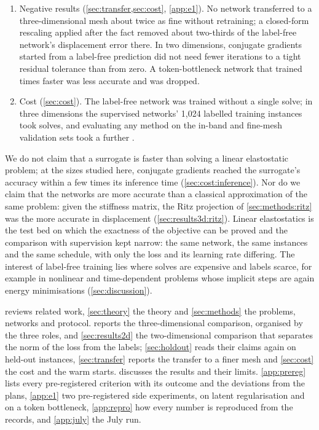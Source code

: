 \begin{enumerate}
label-free transformer on most instances at every degree, and a comparable relative energy
gap at the highest, but median peak stress errors \numRitzValPeakRatioMin{} to
\numRitzValPeakRatioMax{} times as large; on the finer mesh its relative energy gap was
lower than each network's on almost every instance.
\item Negative results (\cref{sec:transfer,sec:cost}, \ref{app:e1}). No network transferred
to a three-dimensional mesh about twice as fine without retraining; a closed-form rescaling
applied after the fact removed about two-thirds of the label-free network's displacement
error there. In two dimensions, conjugate gradients started from a label-free prediction did
not need fewer iterations to a tight residual tolerance than from zero. A token-bottleneck
network that trained \numTimeBottleneckSpeedup{} times faster was less accurate and was
dropped.
\item Cost (\cref{sec:cost}). The label-free network was trained without a single solve;
in three dimensions the supervised networks' 1,024 labelled training instances took
\numThreeTrainSolves{} solves, and evaluating any method on the in-band and fine-mesh
validation sets took a further \numThreeEvalSolves{}.
\end{enumerate}

We do not claim that a surrogate is faster than solving a linear elastostatic problem; at
the sizes studied here, conjugate gradients reached the surrogate's accuracy within a few
times its inference time (\cref{sec:cost:inference}). Nor do we claim that the networks are
more accurate than a classical approximation of the same problem: given the stiffness
matrix, the Ritz projection of \cref{sec:methods:ritz} was the more accurate in displacement
(\cref{sec:results3d:ritz}). Linear elastostatics is the test bed on which the exactness of
the objective can be proved and the comparison
with supervision kept narrow: the same network, the same instances and the same schedule,
with only the loss and its learning rate differing. The interest of label-free training lies
where solves are expensive and labels scarce, for example in nonlinear and time-dependent
problems whose implicit steps are again energy minimisations (\cref{sec:discussion}).

 reviews related work, \cref{sec:theory} the theory and
\cref{sec:methods} the problems, networks and protocol.  reports the
three-dimensional comparison, organised by the three roles, and \cref{sec:results2d} the
two-dimensional comparison that separates the norm of the loss from the labels;
\cref{sec:holdout} reads their claims again on held-out instances, \cref{sec:transfer}
reports the transfer to a finer mesh and \cref{sec:cost} the cost and the warm starts.
 discusses the results and their limits.
\ref{app:prereg} lists every pre-registered criterion with its outcome and the deviations
from the plans, \ref{app:e1} two pre-registered side experiments, on latent regularisation
and on a token bottleneck, \ref{app:repro} how every number is reproduced from the records,
and \ref{app:july} the July run.
